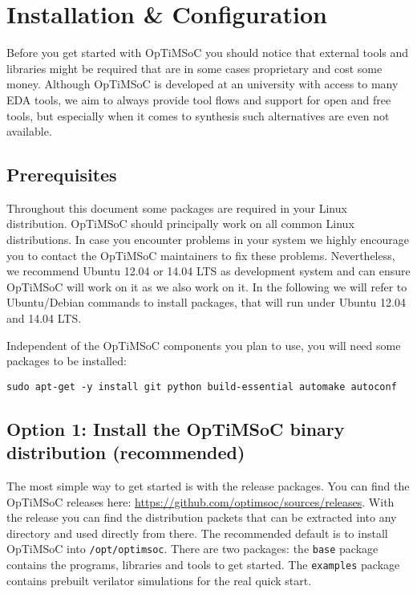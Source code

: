 \chapter{Installation \& Configuration}
\label{chap:installation}

Before you get started with OpTiMSoC you should notice that external
tools and libraries might be required that are in some cases
proprietary and cost some money. Although OpTiMSoC is developed at an
university with access to many EDA tools, we aim to always provide
tool flows and support for open and free tools, but especially when it
comes to synthesis such alternatives are even not available.

\section{Prerequisites}

Throughout this document some packages are required in your Linux
distribution. OpTiMSoC should principally work on all common Linux
distributions. In case you encounter problems in your system we highly
encourage you to contact the OpTiMSoC maintainers to fix these
problems. Nevertheless, we recommend Ubuntu 12.04 or 14.04 LTS as
development system and can ensure OpTiMSoC will work on it as we also
work on it. In the following we will refer to Ubuntu/Debian commands
to install packages, that will run under Ubuntu 12.04 and 14.04 LTS.

Independent of the OpTiMSoC components you plan to use, you will need some
packages to be installed:

\begin{lstlisting}
sudo apt-get -y install git python build-essential automake autoconf
\end{lstlisting}

\section{Option 1: Install the OpTiMSoC binary distribution (recommended)}

The most simple way to get started is with the release packages. You
can find the OpTiMSoC releases here:
\url{https://github.com/optimsoc/sources/releases}. With the release
you can find the distribution packets that can be extracted into any
directory and used directly from there. The recommended default is to
install OpTiMSoC into \verb|/opt/optimsoc|. There are two packages:
the \verb|base| package contains the programs, libraries and tools
to get started. The \verb|examples| package contains prebuilt verilator
simulations for the real quick start.

